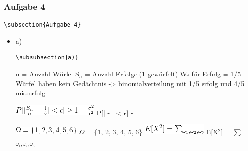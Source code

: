 \documentclass[11pt]{article}
\begin{document}
\subsubsection{Aufgabe 4}
\label{sec-3-8-5}


\begin{verbatim}
\subsection{Aufgabe 4}
\end{verbatim}
\begin{itemize}

\item a)\\
\label{sec-3-8-5-1}%
\begin{verbatim}
\subsubsection{a)}
\end{verbatim}

n = Anzahl Würfel
S$_n$ = Anzahl Erfolge (1 gewürfelt)
Ws für Erfolg = 1/5
Würfel haben kein Gedächtnis -> binomialverteilung
mit 1/5 erfolg und 4/5 misserfolg

\includegraphics[width=.9\linewidth]{201212ad-07284220660MBv.png}
P[| - | < $\epsilon$]  -  

\includegraphics[width=.9\linewidth]{201212ad-07460520660LVE.png}
$\Omega$ = \{1, 2, 3, 4, 5, 6\}
\includegraphics[width=.9\linewidth]{201212ad-07463620660lpQ.png}
E[X$^2$] = $\sum$$_{\omega_1, \omega_2, \omega_3}$


\end{itemize}
\end{document}
